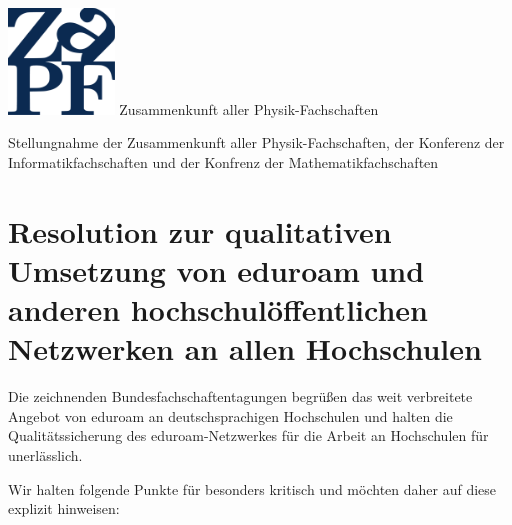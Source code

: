 \documentclass[DIV=calc]{scrartcl}
\begin{document}
\hspace{0.87\textwidth}
\begin{minipage}{120pt}
\vspace{-1.8cm}
\includegraphics[width=80pt]{../../logo.pdf}
\centering
\small Zusammenkunft aller Physik-Fachschaften
\end{minipage}
\begin{center}
\huge{Stellungnahme der Zusammenkunft aller Physik-Fachschaften, der Konferenz
der Informatikfachschaften und der Konfrenz der Mathematikfachschaften} \\
\normalsize
\end{center}

\vspace{1cm}
\section*{Resolution zur qualitativen Umsetzung von  eduroam und anderen
  hochschulöffentlichen Netzwerken an allen Hochschulen}

  Die zeichnenden Bundesfachschaftentagungen begrüßen das weit verbreitete
  Angebot von eduroam an deutschsprachigen Hochschulen und halten die
  Qualitätssicherung des eduroam-Netzwerkes für die Arbeit an Hochschulen für
  unerlässlich.

  Wir halten folgende Punkte für besonders kritisch und möchten daher auf diese
  explizit hinweisen:
\end{document}
